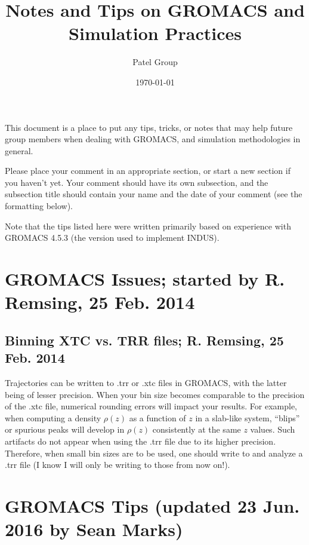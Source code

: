 \documentclass[aip,jmp,superscriptaddress,reprint,onecolumn]{revtex4-1}
\begin{document}
\title{Notes and Tips on GROMACS and Simulation Practices}

\author{Patel Group}


\date{\today}

\maketitle

\raggedbottom

This document is a place to put any tips, tricks, or notes that may help future group members when dealing
with GROMACS, and simulation methodologies in general.

Please place your comment in an appropriate section, or start a new section if you haven't yet. Your comment should have its
own subsection, and the subsection title should contain your name and the date of your comment (see the formatting below).

Note that the tips listed here were written primarily based on experience with GROMACS 4.5.3 (the version used to implement INDUS).

\section{GROMACS Issues; started by R. Remsing, 25 Feb. 2014}

\subsection{Binning XTC vs. TRR files; R. Remsing, 25 Feb. 2014}

Trajectories can be written to .trr or .xtc files in GROMACS, with the latter being of lesser precision.
When your bin size becomes comparable to the precision of the .xtc file, numerical rounding errors will impact
your results. For example, when computing a density $\rho(z)$ as a function of $z$ in a slab-like system,
``blips'' or spurious peaks will develop in $\rho(z)$ consistently at the same $z$ values. Such artifacts
do not appear when using the .trr file due to its higher precision. Therefore, when small bin sizes are
to be used, one should write to and analyze a .trr file (I know I will only be writing to those from now on!).


\section{GROMACS Tips (updated 23 Jun. 2016 by Sean Marks)}
\end{document}
